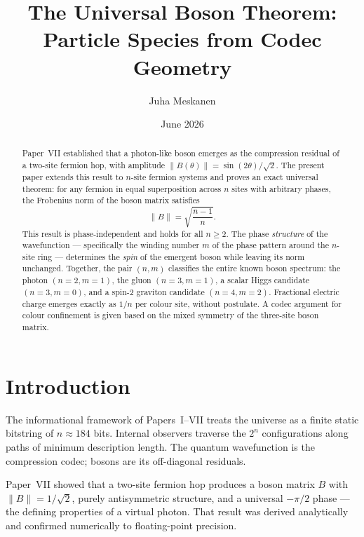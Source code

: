 \documentclass[11pt]{article}
\title{The Universal Boson Theorem:\\
Particle Species from Codec Geometry}
\author{Juha Meskanen}
\date{June 2026}
\begin{document}
\maketitle

\begin{abstract}
Paper~VII established that a photon-like boson emerges as the compression
residual of a two-site fermion hop, with amplitude
$\|B(\theta)\| = \sin(2\theta)/\sqrt{2}$.
The present paper extends this result to $n$-site fermion systems and
proves an exact universal theorem:
for any fermion in equal superposition across $n$ sites with arbitrary
phases, the Frobenius norm of the boson matrix satisfies
\[
  \|B\| = \sqrt{\frac{n-1}{n}}.
\]
This result is phase-independent and holds for all $n \geq 2$.
The phase \emph{structure} of the wavefunction --- specifically the
winding number $m$ of the phase pattern around the $n$-site ring ---
determines the \emph{spin} of the emergent boson while leaving its norm
unchanged.
Together, the pair $(n, m)$ classifies the entire known boson spectrum:
the photon $(n{=}2, m{=}1)$, the gluon $(n{=}3, m{=}1)$, a scalar
Higgs candidate $(n{=}3, m{=}0)$, and a spin-2 graviton candidate
$(n{=}4, m{=}2)$.
Fractional electric charge emerges exactly as $1/n$ per colour site,
without postulate.
A codec argument for colour confinement is given based on the mixed
symmetry of the three-site boson matrix.
\end{abstract}

\tableofcontents
\newpage

\section{Introduction}
\label{sec:intro}

The informational framework of Papers~I--VII
\cite{meskanen2001,meskanen2026iv,meskanen2026v,meskanen2026vi,meskanen2026vii}
treats the universe as a finite static bitstring of $n \approx 184$ bits.
Internal observers traverse the $2^n$ configurations along paths of
minimum description length.
The quantum wavefunction is the compression codec; bosons are its
off-diagonal residuals.

Paper~VII showed that a two-site fermion hop produces a boson matrix $B$
with $\|B\| = 1/\sqrt{2}$, purely antisymmetric structure, and a universal
$-\pi/2$ phase --- the defining properties of a virtual photon.
That result was derived analytically and confirmed numerically to
floating-point precision.
\end{document}
